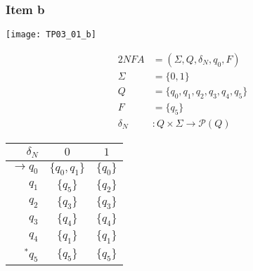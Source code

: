 {\subsubsection{Item b}
\begin{center} \texttt{[image: TP03\_01\_b]} \end{center}
\begin{center}
	\begin{minipage}[c]{0.30\textwidth}
		\begin{alignat*}{2}
			NFA       &= (\Sigma, Q, \delta_N, q_0, F)\\
			\Sigma    &= \{0,1\}\\
			Q         &= \{q_0,q_1,q_2,q_3,q_4,q_5\}\\
			F         &= \{q_5\}\\
			\delta_N &\colon Q \times \Sigma \rightarrow \mathscr{P}(Q)
		\end{alignat*}
	\end{minipage}
	\begin{minipage}[c]{0.25\textwidth}
		\begin{center}
		\begin{tabular}{ r | c c }
 			$\delta_N$ & $0$ & $1$ \\ \hline
 			$\rightarrow q_0$ & $\{q_0,q_1\}$ & $\{q_0\}$ \\  
 			$            q_1$ & $\{q_5    \}$ & $\{q_2\}$ \\
 			$            q_2$ & $\{q_3    \}$ & $\{q_3\}$ \\
 			$            q_3$ & $\{q_4    \}$ & $\{q_4\}$ \\
 			$            q_4$ & $\{q_1    \}$ & $\{q_1\}$ \\
 			$      ^* q_5$ & $\{q_5    \}$ & $\{q_5\}$ 
		\end{tabular}
		\end{center}
	\end{minipage}
\end{center}
\pagebreak
}
